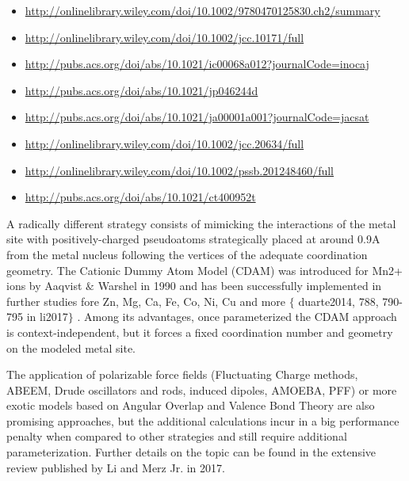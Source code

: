 \begin{itemize}
	\item \href{http://onlinelibrary.wiley.com/doi/10.1002/9780470125830.ch2/summary}{http://onlinelibrary.wiley.com/doi/10.1002/9780470125830.ch2/summary}

	\item \href{http://onlinelibrary.wiley.com/doi/10.1002/jcc.10171/full}{http://onlinelibrary.wiley.com/doi/10.1002/jcc.10171/full}

	\item \href{http://pubs.acs.org/doi/abs/10.1021/ic00068a012?journalCode=inocaj}{http://pubs.acs.org/doi/abs/10.1021/ic00068a012?journalCode=inocaj}

	\item \href{http://pubs.acs.org/doi/abs/10.1021/jp046244d}{http://pubs.acs.org/doi/abs/10.1021/jp046244d}

	\item \href{http://pubs.acs.org/doi/abs/10.1021/ja00001a001?journalCode=jacsat}{http://pubs.acs.org/doi/abs/10.1021/ja00001a001?journalCode=jacsat}

	\item \href{http://onlinelibrary.wiley.com/doi/10.1002/jcc.20634/full}{http://onlinelibrary.wiley.com/doi/10.1002/jcc.20634/full}

	\item \href{http://onlinelibrary.wiley.com/doi/10.1002/pssb.201248460/full}{http://onlinelibrary.wiley.com/doi/10.1002/pssb.201248460/full}

	\item \href{http://pubs.acs.org/doi/abs/10.1021/ct400952t}{http://pubs.acs.org/doi/abs/10.1021/ct400952t}
\end{itemize}

A radically different strategy consists of mimicking the interactions of the metal site with positively-charged pseudoatoms strategically placed at around 0.9A from the metal nucleus following the vertices of the adequate coordination geometry. The Cationic Dummy Atom Model (CDAM) was introduced for Mn2+ ions by Aaqvist $\&$  Warshel in 1990\cite{aaqvist1990} and has been successfully implemented in further studies fore Zn, Mg, Ca, Fe, Co, Ni, Cu and more $ \{ $ duarte2014, 788, 790-795 in li2017$ \} $ . Among its advantages, once parameterized the CDAM approach is context-independent, but it forces a fixed coordination number and geometry on the modeled metal site.

The application of polarizable force fields (Fluctuating Charge methods, ABEEM, Drude oscillators and rods, induced dipoles, AMOEBA, PFF) or more exotic models based on Angular Overlap and Valence Bond Theory are also promising approaches, but the additional calculations incur in a big performance penalty when compared to other strategies and still require additional parameterization. Further details on the topic can be found in the extensive review published by Li and Merz Jr. in 2017.\cite{li2017}

